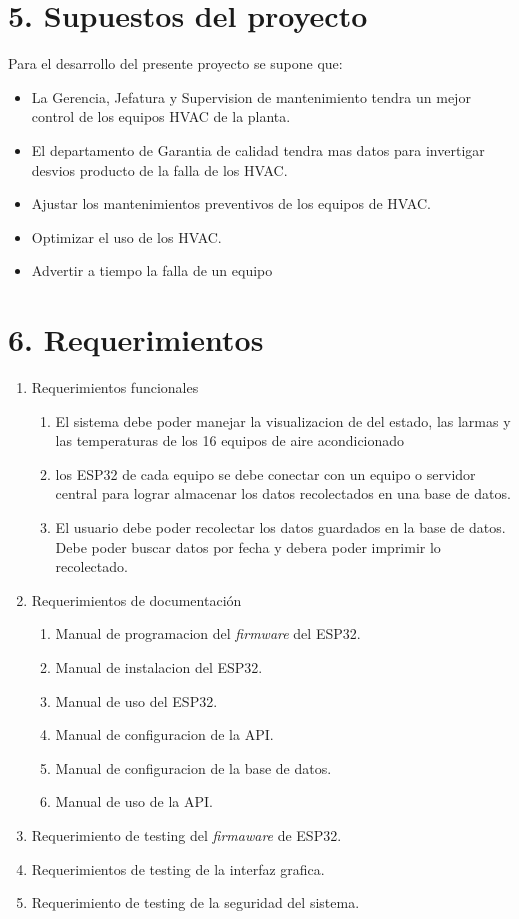 \documentclass[
11pt, %
codirector, %
]{charter}
\begin{document}
\section{5. Supuestos del proyecto}
\label{sec:supuestos}

Para el desarrollo del presente proyecto se supone que:




\begin{itemize}
	\item La Gerencia, Jefatura y Supervision de mantenimiento tendra un mejor control de los equipos HVAC de la planta.
	\item El departamento de Garantia de calidad tendra mas datos para invertigar desvios producto de la falla de los HVAC.
	\item Ajustar los mantenimientos preventivos de los equipos de HVAC.
	\item Optimizar el uso de los HVAC.
	\item Advertir a tiempo la falla de un equipo 
\end{itemize}

\section{6. Requerimientos}
\label{sec:requerimientos}

\begin{enumerate}
	\item Requerimientos funcionales
		\begin{enumerate}
			\item El sistema debe poder manejar la visualizacion de del estado, las larmas y las temperaturas de los 16 equipos de aire acondicionado
			\item los ESP32 de cada equipo se debe conectar con un equipo o servidor central para lograr almacenar los datos recolectados en una base de datos.
			\item El usuario debe poder recolectar los datos guardados en la base de datos. Debe poder buscar datos por fecha y debera poder imprimir lo recolectado.
		\end{enumerate}
	\item Requerimientos de documentación
		\begin{enumerate}
			\item Manual de programacion del \textit {firmware} del ESP32.
			\item Manual de instalacion del ESP32.
			\item Manual de uso del ESP32.
			\item Manual de configuracion de la API.
			\item Manual de configuracion de la base de datos.
			\item Manual de uso de la API.
			
			
		\end{enumerate}
	\item Requerimiento de testing del \textit{firmaware} de ESP32.
	\item Requerimientos de testing de la interfaz grafica.
	\item Requerimiento de testing de la seguridad del sistema.
\end{enumerate}
\end{document}
